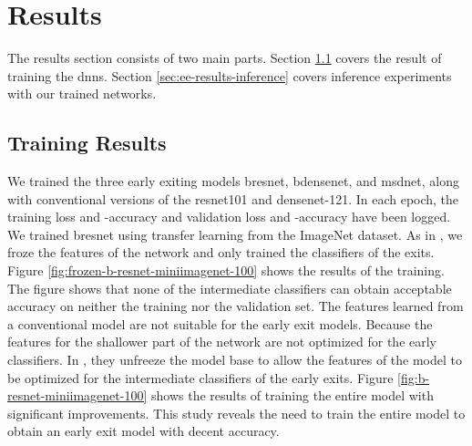 \section{Results} \label{sec:ee-results}

The results section consists of two main parts. Section \ref{sec:ee-results-training} covers the result of training the \gls{dnn}s. Section \ref{sec:ee-results-inference}  covers inference experiments with our trained networks. 

\subsection{Training Results} \label{sec:ee-results-training}
We trained the three early exiting models \gls{bresnet}, \gls{bdensenet}, and \gls{msdnet}, along with conventional versions of the \gls{resnet}101 and \gls{densenet}-121.  In each epoch, the training loss and -accuracy and validation loss and -accuracy have been logged.
We trained \gls{bresnet} using transfer learning from the ImageNet dataset. As in \cite{leroux_resource-constrained_2015}, we froze the features of the network and only trained the classifiers of the exits. Figure \ref{fig:frozen-b-resnet-miniimagenet-100} shows the results of the training. The figure shows that none of the intermediate classifiers can obtain acceptable accuracy on neither the training nor the validation set. The features learned from a conventional model are not suitable for the early exit models. Because the features for the shallower part of the network are not optimized for the early classifiers. In \cite{teerapittayanon_branchynet:_2016}, they unfreeze the model base to allow the features of the model to be optimized for the intermediate classifiers of the early exits. Figure \ref{fig:b-resnet-miniimagenet-100} shows the results of training the entire model with significant improvements. This study reveals the need to train the entire model to obtain an early exit model with decent accuracy.
